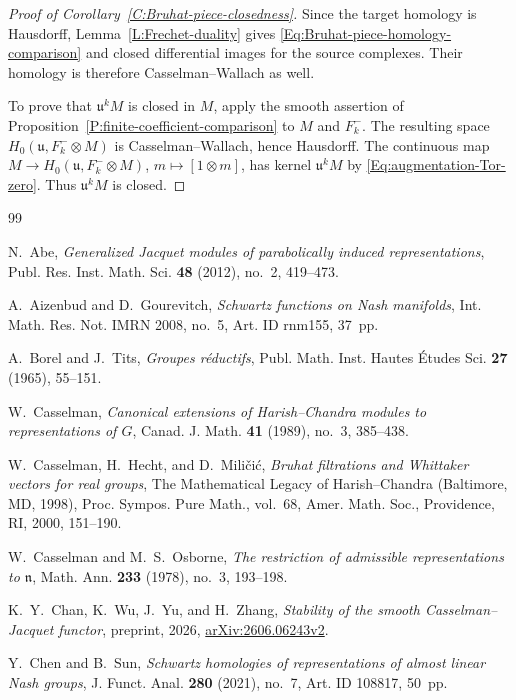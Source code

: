 \documentclass[a4paper,12pt]{amsart}
\numberwithin{equation}{section}
\theoremstyle{plain}
\theoremstyle{definition}
\theoremstyle{remark}
\begin{document}
\begin{proof}[Proof of Corollary~\ref{C:Bruhat-piece-closedness}]
Since the target homology is Hausdorff, Lemma~\ref{L:Frechet-duality} gives \eqref{Eq:Bruhat-piece-homology-comparison} and closed differential images for the source complexes.
Their homology is therefore Casselman--Wallach as well.

To prove that $\mathfrak u^kM$ is closed in $M$, apply the smooth assertion of Proposition~\ref{P:finite-coefficient-comparison} to $M$ and $F_k^-$.
The resulting space $H_0(\mathfrak u,F_k^-\otimes M)$ is Casselman--Wallach, hence Hausdorff.
The continuous map $M\to H_0(\mathfrak u,F_k^-\otimes M)$, $m\mapsto[1\otimes m]$, has kernel $\mathfrak u^kM$ by \eqref{Eq:augmentation-Tor-zero}.
Thus $\mathfrak u^kM$ is closed.
\end{proof}

\begin{thebibliography}{99}

N.~Abe, \emph{Generalized Jacquet modules of parabolically induced representations}, Publ. Res. Inst. Math. Sci. \textbf{48} (2012), no.~2, 419--473.

A.~Aizenbud and D.~Gourevitch, \emph{Schwartz functions on Nash manifolds}, Int. Math. Res. Not. IMRN 2008, no.~5, Art. ID rnm155, 37~pp.

A.~Borel and J.~Tits, \emph{Groupes r\'eductifs}, Publ. Math. Inst. Hautes \'Etudes Sci. \textbf{27} (1965), 55--151.

W.~Casselman, \emph{Canonical extensions of Harish--Chandra modules to representations of $G$}, Canad. J. Math. \textbf{41} (1989), no.~3, 385--438.

W.~Casselman, H.~Hecht, and D.~Mili\v{c}i\'c, \emph{Bruhat filtrations and Whittaker vectors for real groups}, The Mathematical Legacy of Harish--Chandra (Baltimore, MD, 1998), Proc. Sympos. Pure Math., vol.~68, Amer. Math. Soc., Providence, RI, 2000, 151--190.

W.~Casselman and M.~S.~Osborne, \emph{The restriction of admissible representations to $\mathfrak n$}, Math. Ann. \textbf{233} (1978), no.~3, 193--198.

K.~Y.~Chan, K.~Wu, J.~Yu, and H.~Zhang, \emph{Stability of the smooth Casselman--Jacquet functor}, preprint, 2026, \href{https://arxiv.org/abs/2606.06243v2}{arXiv:2606.06243v2}.

Y.~Chen and B.~Sun, \emph{Schwartz homologies of representations of almost linear Nash groups}, J. Funct. Anal. \textbf{280} (2021), no.~7, Art. ID 108817, 50~pp.


\end{thebibliography}
\end{document}
